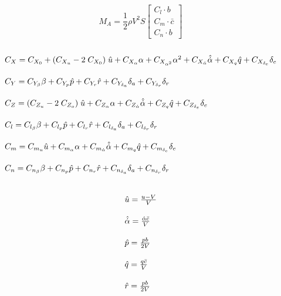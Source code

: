 \begin{equation}
\label{eq:m_a}
{M_A} = \frac{1}{2}\rho {V^2}S\left[ {\begin{array}{*{20}{c}}
{{C_l} \cdot b}\\
{{C_m} \cdot \bar c}\\
{{C_n} \cdot b}
\end{array}} \right]
\end{equation}

\begin{equation}
\label{eq:body_coefs}
\arraycolsep=1.4pt\def\arraystretch{2.2}
\begin{array}{l}
{C_X} = C_{{X_0}} + ({C_{{X_u}}} - 2\;{C_{{X_0}}})\;\hat u + {C_{{X_\alpha }}}\alpha  + {C_{{X_{{\alpha ^2}}}}}{\alpha ^2} + C_{{X_{\dot{\alpha}}}}\hat{\dot{\alpha}}  + {C_{{X_q}}}\hat q + {C_{{X_{{\delta _e}}}}}{\delta _e}\\
{C_Y} = {C_{{Y_\beta }}}\beta  + {C_{{Y_p}}}\hat p + {C_{{Y_r}}}\hat r + {C_{{Y_{{\delta _a}}}}}{\delta _a} + {C_{{Y_{{\delta _r}}}}}{\delta _r}\\
{C_Z} = ({C_{{Z_u}}} - 2\;{C_{{Z_o}}})\;\hat u + {C_{{Z_\alpha }}}\alpha  + {C_{{Z_{\dot{\alpha}}}}\hat{\dot{\alpha}} + {C_{{Z_q}}}\hat q + C_{{Z_{{\delta _e}}}}}{\delta _e}\\
{C_l} = {C_{{l_\beta }}}\beta  + {C_{{l_p}}}\hat p + {C_{{l_r}}}\hat r + {C_{{l_{{\delta _a}}}}}{\delta _a} + {C_{{l_{{\delta _r}}}}}{\delta _r}\\
{C_m} = {C_{{m_u}}}\hat u + {C_{{m_\alpha }}}\alpha  + C_{{m_{\dot{\alpha}}}}\hat{\dot{\alpha}}  + {C_{{m_q}}}\hat q + {C_{{m_{{\delta _e}}}}}{\delta _e}\\
{C_n} = {C_{{n_\beta }}}\beta  + {C_{{n_p}}}\hat p + {C_{{n_r}}}\hat r + {C_{{n_{{\delta _a}}}}}{\delta _a} + {C_{{n_{{\delta _r}}}}}{\delta _r}
\end{array}
\end{equation}

\begin{equation}
\label{eq:dim_less_rates}
\arraycolsep=1.4pt\def\arraystretch{2.2}
\begin{array}{l}
\hat u = \frac{{u - V}}{V}\\
\hat{\dot{\alpha}} = \frac{\dot{\alpha}\bar{c}}{V}\\
\hat p = \frac{{pb}}{{2V}}\\
\hat q = \frac{{q\bar c}}{V}\\
\hat r = \frac{{pb}}{{2V}}
\end{array}
\end{equation}


